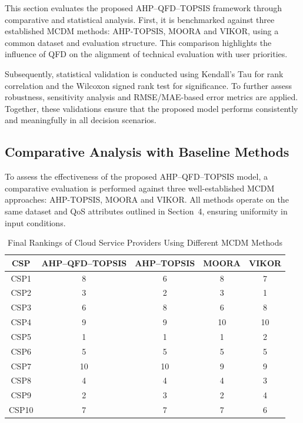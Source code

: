 \documentclass[twocolumn]{svjour3}
\begin{document}
This section evaluates the proposed AHP–QFD–TOPSIS framework through comparative and statistical analysis. First, it is benchmarked against three established MCDM methods: AHP-TOPSIS, MOORA and VIKOR, using a common dataset and evaluation structure. This comparison highlights the influence of QFD on the alignment of technical evaluation with user priorities.

Subsequently, statistical validation is conducted using Kendall’s Tau for rank correlation and the Wilcoxon signed rank test for significance. To further assess robustness, sensitivity analysis and RMSE/MAE-based error metrics are applied. Together, these validations ensure that the proposed model performs consistently and meaningfully in all decision scenarios.

\subsection{Comparative Analysis with Baseline Methods}

To assess the effectiveness of the proposed AHP–QFD–TOPSIS model, a comparative evaluation is performed against three well-established MCDM approaches: AHP-TOPSIS, MOORA and VIKOR. All methods operate on the same dataset and QoS attributes outlined in Section~4, ensuring uniformity in input conditions.

\begin{table}[H]
\centering
\caption{Final Rankings of Cloud Service Providers Using Different MCDM Methods}
\label{tab:method_comparison_ranks}
\begin{tabular}{|c|c|c|c|c|}
\hline
\textbf{CSP} & \textbf{AHP–QFD–TOPSIS} & \textbf{AHP–TOPSIS} & \textbf{MOORA} & \textbf{VIKOR} \\
\hline
CSP1  & 8  & 6  & 8  & 7  \\
CSP2  & 3  & 2  & 3  & 1  \\
CSP3  & 6  & 8  & 6  & 8  \\
CSP4  & 9  & 9  & 10 & 10 \\
CSP5  & 1  & 1  & 1  & 2  \\
CSP6  & 5  & 5  & 5  & 5  \\
CSP7  & 10 & 10 & 9  & 9  \\
CSP8  & 4  & 4  & 4  & 3  \\
CSP9  & 2  & 3  & 2  & 4  \\
CSP10 & 7  & 7  & 7  & 6  \\
\hline
\end{tabular}
\end{table}
\end{document}
